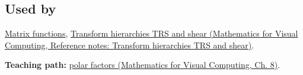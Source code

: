 \subsection{Used by}\label{appendix-73f5bcf7a462-used-by}

\hypertarget{appendix-73f5bcf7a462-used-by}{}

\hyperref[appendix-0f4bc2bf2b1f]{Matrix functions}, \href{../02-Mathematics-for-Visual-Computing/main.pdf\#nameddest=appendix-292c061cd47c}{Transform hierarchies TRS and shear (Mathematics for Visual Computing, Reference notes: Transform hierarchies TRS and shear)}.

\textbf{Teaching path:} \href{../02-Mathematics-for-Visual-Computing/main.pdf\#nameddest=02-foundations-ii-ch024-polar-decomposition-separates-rotation-like-motion-from-stretch}{polar factors (Mathematics for Visual Computing, Ch. 8)}.
